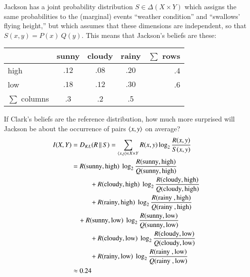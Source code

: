 \documentclass[nobib,nofonts]{tufte-handout}
\begin{document}
\begin{example}
\begin{center}
  \end{center}
  Jackson has a joint probability distribution $S \in \Delta(X \times Y)$ which assigns the same probabilities to the (marginal) events ``weather condition'' and ``swallows' flying height,'' but which assumes that these dimensions are independent, so that $S(x,y) = P(x) \ Q(y)$.
  This means that Jackson's beliefs are these:
  \begin{center}
    \begin{tabular}{lcccr}
                     & sunny & cloudy & rainy & $\sum$ rows \\ \midrule
      high           & $.12$ & $.08$  & $.20$ & .4 \\
      low            & $.18$ & $.12$  & $.30$ & .6 \\ \midrule
      $\sum$ columns & .3    & .2     & .5
    \end{tabular}
  \end{center}
  If Clark's beliefs are the reference distribution, how much more surprised will Jackson be about the occurrence of pairs $\left \langle x,y\right\rangle$ on average?
  \begin{align*}
    I(X,Y) & =  D_{KL}(R \,||\, S) = \sum_{\tuple{x,y} \in X \times Y} R(x,y) \log_{2} \frac{R(x,y)}{S(x,y)} \\
           & = R(\text{sunny} , \text{high}) \ \log_{2} \frac{R(\text{sunny} , \text{high})}{Q(\text{sunny} , \text{high})}  \\
           & \ \ \ \ \ \ \ \ \ \ \ + R(\text{cloudy} , \text{high}) \ \log_{2} \frac{R(\text{cloudy} , \text{high})}{Q(\text{cloudy} , \text{high})} \\
           & \ \ \ \ \ \ \ \ \ \ \ + R(\text{rainy} , \text{high}) \ \log_{2} \frac{R(\text{rainy } , \text{high})}{Q(\text{rainy } , \text{high})} \\
           & \ \ \ \ +  R(\text{sunny} , \text{low}) \ \log_{2} \frac{R(\text{sunny} , \text{low})}{Q(\text{sunny} , \text{low})}  \\
           & \ \ \ \ \ \ \ \ \ \ \ + R(\text{cloudy} , \text{low}) \ \log_{2} \frac{R(\text{cloudy} , \text{low})}{Q(\text{cloudy} , \text{low})} \\
           & \ \ \ \ \ \ \ \ \ \ \ + R(\text{rainy} , \text{low}) \ \log_{2} \frac{R(\text{rainy } , \text{low})}{Q(\text{rainy } , \text{low})} \\
    & \approx 0.24
  \end{align*}
\end{example}
\end{document}
